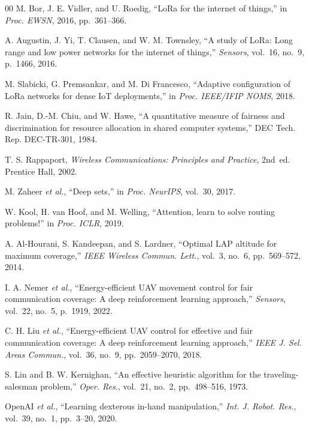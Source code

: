 \documentclass[conference]{IEEEtran}
\begin{document}
\begin{thebibliography}{00}
M. Bor, J. E. Vidler, and U. Roedig,
``{LoRa} for the internet of things,''
in \textit{Proc. EWSN}, 2016, pp.~361--366.

A. Augustin, J. Yi, T. Clausen, and W. M. Townsley,
``A study of {LoRa}: Long range and low power networks
for the internet of things,''
\textit{Sensors}, vol.~16, no.~9, p.~1466, 2016.

M. Slabicki, G. Premsankar, and M. Di Francesco,
``Adaptive configuration of {LoRa} networks for dense {IoT} deployments,''
in \textit{Proc. IEEE/IFIP NOMS}, 2018.

R. Jain, D.-M. Chiu, and W. Hawe,
``A quantitative measure of fairness and discrimination
for resource allocation in shared computer systems,''
DEC Tech. Rep. DEC-TR-301, 1984.

T. S. Rappaport,
\textit{Wireless Communications: Principles and Practice}, 2nd~ed.
Prentice Hall, 2002.

M. Zaheer \textit{et al.},
``Deep sets,''
in \textit{Proc. NeurIPS}, vol.~30, 2017.

W. Kool, H. van Hoof, and M. Welling,
``Attention, learn to solve routing problems!''
in \textit{Proc. ICLR}, 2019.

A. Al-Hourani, S. Kandeepan, and S. Lardner,
``Optimal {LAP} altitude for maximum coverage,''
\textit{IEEE Wireless Commun. Lett.}, vol.~3, no.~6,
pp.~569--572, 2014.

I. A. Nemer \textit{et al.},
``Energy-efficient {UAV} movement control for fair communication
coverage: A deep reinforcement learning approach,''
\textit{Sensors}, vol.~22, no.~5, p.~1919, 2022.

C. H. Liu \textit{et al.},
``Energy-efficient {UAV} control for effective and fair communication
coverage: A deep reinforcement learning approach,''
\textit{IEEE J. Sel. Areas Commun.}, vol.~36, no.~9,
pp.~2059--2070, 2018.

S. Lin and B. W. Kernighan,
``An effective heuristic algorithm for the traveling-salesman problem,''
\textit{Oper. Res.}, vol.~21, no.~2, pp.~498--516, 1973.

{OpenAI} \textit{et al.},
``Learning dexterous in-hand manipulation,''
\textit{Int. J. Robot. Res.}, vol.~39, no.~1, pp.~3--20, 2020.


\end{thebibliography}
\end{document}
